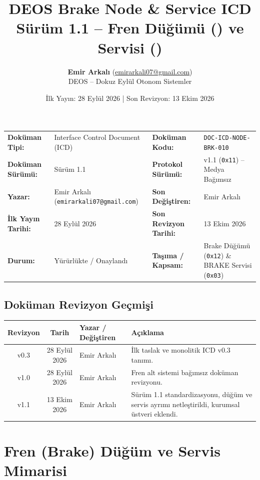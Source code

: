 \documentclass[a4paper,10pt]{article}
\title{\textbf{DEOS Brake Node \& Service ICD}\\
\large Sürüm 1.1 -- Fren Düğümü (\hex{12}) ve Servisi (\hex{03})}
\author{\textbf{Emir Arkalı} (\href{mailto:emirarkali07@gmail.com}{emirarkali07@gmail.com})\\DEOS -- Dokuz Eylül Otonom Sistemler}
\date{İlk Yayın: 28 Eylül 2026 \quad | \quad Son Revizyon: 13 Ekim 2026}
\newcommand{\hex}[1]{\texttt{0x#1}}
\newcommand{\code}[1]{\texttt{#1}}
\begin{document}
\maketitle

\begin{center}
\small
\begin{tabularx}{\textwidth}{ll lX}
\toprule
\textbf{Doküman Tipi:} & Interface Control Document (ICD) & \textbf{Doküman Kodu:} & \code{DOC-ICD-NODE-BRK-010} \\
\textbf{Doküman Sürümü:} & Sürüm 1.1 & \textbf{Protokol Sürümü:} & v1.1 (\hex{11}) -- Medya Bağımsız \\
\textbf{Yazar:} & Emir Arkalı (\texttt{emirarkali07@gmail.com}) & \textbf{Son Değiştiren:} & Emir Arkalı \\
\textbf{İlk Yayın Tarihi:} & 28 Eylül 2026 & \textbf{Son Revizyon Tarihi:} & 13 Ekim 2026 \\
\textbf{Durum:} & Yürürlükte / Onaylandı & \textbf{Taşıma / Kapsam:} & Brake Düğümü (\hex{12}) \& BRAKE Servisi (\hex{03}) \\
\bottomrule
\end{tabularx}
\end{center}

\subsection*{Doküman Revizyon Geçmişi}
\begin{center}
\small
\begin{tabularx}{\textwidth}{c c l X}
\toprule
\textbf{Revizyon} & \textbf{Tarih} & \textbf{Yazar / Değiştiren} & \textbf{Açıklama} \\
\midrule
v0.3 & 28 Eylül 2026 & Emir Arkalı & İlk taslak ve monolitik ICD v0.3 tanımı. \\
v1.0 & 28 Eylül 2026 & Emir Arkalı & Fren alt sistemi bağımsız doküman revizyonu. \\
v1.1 & 13 Ekim 2026 & Emir Arkalı & Sürüm 1.1 standardizasyonu, düğüm ve servis ayrımı netleştirildi, kurumsal üstveri eklendi. \\
\bottomrule
\end{tabularx}
\end{center}
\vspace{0.8em}

\section{Fren (Brake) Düğüm ve Servis Mimarisi}
\end{document}
